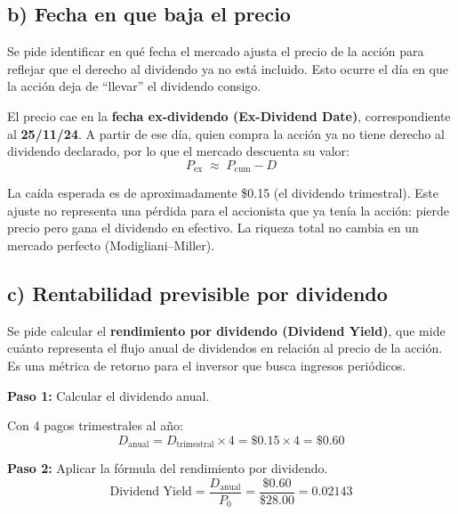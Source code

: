 \documentclass[12pt,a4paper]{article}
\begin{document}
\subsection*{b) Fecha en que baja el precio}

\begin{intuicion}
Se pide identificar en qué fecha el mercado ajusta el precio de la acción
para reflejar que el derecho al dividendo ya no está incluido. Esto ocurre
el día en que la acción deja de ``llevar'' el dividendo consigo.
\end{intuicion}

El precio cae en la \textbf{fecha ex-dividendo (Ex-Dividend Date)},
correspondiente al \textbf{25/11/24}. A partir de ese día, quien compra
la acción ya no tiene derecho al dividendo declarado, por lo que el mercado
descuenta su valor:
\[
P_{\text{ex}} \;\approx\; P_{\text{cum}} - D
\]

\begin{interpretacion}
La caída esperada es de aproximadamente \$0.15 (el dividendo trimestral).
Este ajuste no representa una pérdida para el accionista que ya tenía la
acción: pierde precio pero gana el dividendo en efectivo. La riqueza total
no cambia en un mercado perfecto (Modigliani--Miller).
\end{interpretacion}

\subsection*{c) Rentabilidad previsible por dividendo}

\begin{intuicion}
Se pide calcular el \textbf{rendimiento por dividendo (Dividend Yield)},
que mide cuánto representa el flujo anual de dividendos en relación al
precio de la acción. Es una métrica de retorno para el inversor que busca
ingresos periódicos.
\end{intuicion}

\textbf{Paso 1:} Calcular el dividendo anual.

Con 4 pagos trimestrales al año:
\[
D_{\text{anual}} = D_{\text{trimestral}} \times 4 = \$0.15 \times 4 = \$0.60
\]

\textbf{Paso 2:} Aplicar la fórmula del rendimiento por dividendo.
\[
\text{Dividend Yield} = \frac{D_{\text{anual}}}{P_0}
= \frac{\$0.60}{\$28.00}
= 0.02143
\]
\end{document}
